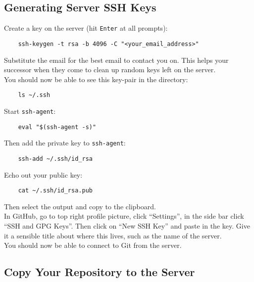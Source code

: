 \subsection{Generating Server SSH Keys}

Create a key on the server (hit \texttt{Enter} at all prompts):

\begin{verbatim}
    ssh-keygen -t rsa -b 4096 -C "<your_email_address>"
\end{verbatim}

Substitute the email for the best email to contact you on. This helps your successor when they come to clean up random keys left on the server.
\\


You should now be able to see this key-pair in the directory:

\begin{verbatim}
    ls ~/.ssh
\end{verbatim}

Start \texttt{ssh-agent}:

\begin{verbatim}
    eval "$(ssh-agent -s)"
\end{verbatim}

Then add the private key to \texttt{ssh-agent}:

\begin{verbatim}
    ssh-add ~/.ssh/id_rsa
\end{verbatim}

Echo out your public key:

\begin{verbatim}
    cat ~/.ssh/id_rsa.pub
\end{verbatim}

Then select the output and copy to the clipboard.
\\

In GitHub, go to top right profile picture, click ``Settings'', in the side bar click ``SSH and GPG Keys''. Then click on ``New SSH Key'' and paste in the key. Give it a sensible title about where this lives, such as the name of the server.
\\

You should now be able to connect to Git from the server.


\subsection{Copy Your Repository to the Server}


